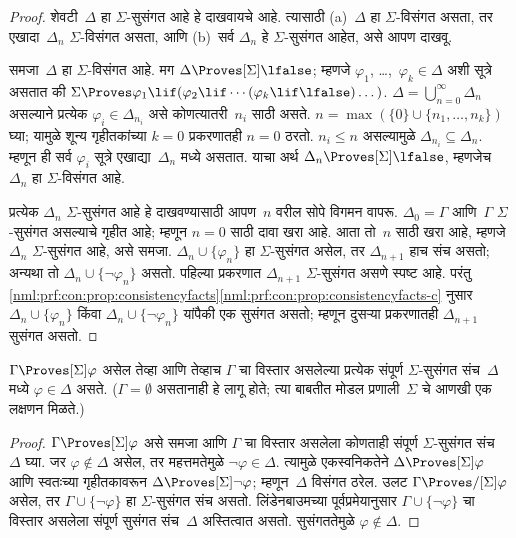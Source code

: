 \begin{proof}
शेवटी~$\Delta$ हा $\Sigma$-सुसंगत आहे हे दाखवायचे आहे.
त्यासाठी (a)~$\Delta$ हा $\Sigma$-विसंगत असता, तर
एखादा~$\Delta_n$ $\Sigma$-विसंगत असता, आणि
(b)~सर्व $\Delta_n$ हे $\Sigma$-सुसंगत आहेत,
असे आपण दाखवू.

समजा~$\Delta$ हा $\Sigma$-विसंगत आहे. मग
$\Delta \Proves[\Sigma] \lfalse$; म्हणजे
$\varphi_1$, \dots,~$\varphi_k \in \Delta$ अशी सूत्रे असतात की
$\Sigma \Proves \varphi_1 \lif (\varphi_2 \lif \cdots (\varphi_k
\lif \lfalse)\dots)$. $\Delta = \bigcup_{n=0}^\infty \Delta_n$
असल्याने प्रत्येक $\varphi_i \in \Delta_{n_i}$ असे कोणत्यातरी~$n_i$
साठी असते. $n=\max(\{0\}\cup\{n_1,\dots,n_k\})$ घ्या;
यामुळे शून्य गृहीतकांच्या $k=0$ प्रकरणातही $n=0$ ठरतो. $n_i \le n$ असल्यामुळे
$\Delta_{n_i} \subseteq \Delta_n$. म्हणून ही सर्व
$\varphi_i$ सूत्रे एखाद्या~$\Delta_n$ मध्ये असतात.
याचा अर्थ $\Delta_n \Proves[\Sigma] \lfalse$,
म्हणजेच~$\Delta_n$ हा $\Sigma$-विसंगत आहे.

प्रत्येक $\Delta_n$ $\Sigma$-सुसंगत आहे हे दाखवण्यासाठी
आपण~$n$ वरील सोपे विगमन वापरू. $\Delta_0 = \Gamma$
आणि~$\Gamma$ $\Sigma$-सुसंगत असल्याचे गृहीत आहे;
म्हणून $n = 0$ साठी दावा खरा आहे. आता तो~$n$
साठी खरा आहे, म्हणजे $\Delta_n$ $\Sigma$-सुसंगत
आहे, असे समजा. $\Delta_n \cup \{\varphi_n\}$ हा
$\Sigma$-सुसंगत असेल, तर $\Delta_{n+1}$ हाच
संच असतो; अन्यथा तो $\Delta_n \cup \{\lnot\varphi_n\}$
असतो. पहिल्या प्रकरणात $\Delta_{n+1}$
$\Sigma$-सुसंगत असणे स्पष्ट आहे. परंतु
\ref{nml:prf:con:prop:consistencyfacts}\ref{nml:prf:con:prop:consistencyfacts-c}
नुसार $\Delta_n \cup \{\varphi_n\}$ किंवा
$\Delta_n \cup \{\lnot\varphi_n\}$ यांपैकी एक
सुसंगत असतो; म्हणून दुसऱ्या प्रकरणातही
$\Delta_{n+1}$ सुसंगत असतो.
\end{proof}

\begin{cor}\label{nml:com:lin:cor:provability-characterization}
  $\Gamma \Proves[\Sigma] \varphi$ असेल तेव्हा आणि तेव्हाच
  $\Gamma$ चा विस्तार असलेल्या प्रत्येक संपूर्ण
  $\Sigma$-सुसंगत संच~$\Delta$ मध्ये $\varphi \in \Delta$
  असते. ($\Gamma = \emptyset$ असतानाही हे लागू होते;
  त्या बाबतीत मोडल प्रणाली~$\Sigma$ चे आणखी एक
  लक्षणन मिळते.)
\end{cor}

\begin{proof}
  $\Gamma \Proves[\Sigma] \varphi$ असे समजा आणि
  $\Gamma$ चा विस्तार असलेला कोणताही संपूर्ण
  $\Sigma$-सुसंगत संच~$\Delta$ घ्या. जर $\varphi
  \notin \Delta$ असेल, तर महत्तमतेमुळे
  $\lnot\varphi \in \Delta$. त्यामुळे एकस्वनिकतेने
  $\Delta \Proves[\Sigma] \varphi$ आणि स्वतःच्या गृहीतकावरून
  $\Delta \Proves[\Sigma] \lnot\varphi$; म्हणून~$\Delta$
  विसंगत ठरेल. उलट $\Gamma \Proves/[\Sigma] \varphi$
  असेल, तर $\Gamma \cup \{ \lnot\varphi\}$ हा
  $\Sigma$-सुसंगत संच असतो. लिंडेनबाउमच्या
  पूर्वप्रमेयानुसार $\Gamma \cup \{ \lnot\varphi \}$
  चा विस्तार असलेला संपूर्ण सुसंगत संच~$\Delta$
  अस्तित्वात असतो. सुसंगततेमुळे $\varphi
  \notin \Delta$.
\end{proof}













